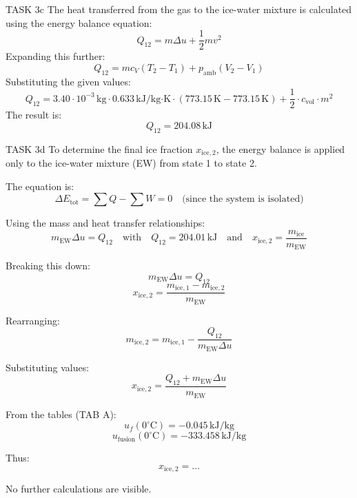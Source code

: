 TASK 3c  
The heat transferred from the gas to the ice-water mixture is calculated using the energy balance equation:  
\[
Q_{12} = m \Delta u + \frac{1}{2} m v^2
\]  
Expanding this further:  
\[
Q_{12} = m c_V (T_2 - T_1) + p_{\text{amb}} (V_2 - V_1)
\]  
Substituting the given values:  
\[
Q_{12} = 3.40 \cdot 10^{-3} \, \text{kg} \cdot 0.633 \, \text{kJ/kg·K} \cdot (773.15 \, \text{K} - 773.15 \, \text{K}) + \frac{1}{2} \cdot c_{\text{vol}} \cdot m^2
\]  
The result is:  
\[
Q_{12} = 204.08 \, \text{kJ}
\]  

TASK 3d  
To determine the final ice fraction \( x_{\text{ice},2} \), the energy balance is applied only to the ice-water mixture (EW) from state 1 to state 2.  

The equation is:  
\[
\Delta E_{\text{tot}} = \sum Q - \sum W = 0 \quad \text{(since the system is isolated)}
\]  

Using the mass and heat transfer relationships:  
\[
m_{\text{EW}} \Delta u = Q_{12} \quad \text{with} \quad Q_{12} = 204.01 \, \text{kJ} \quad \text{and} \quad x_{\text{ice},2} = \frac{m_{\text{ice}}}{m_{\text{EW}}}
\]  

Breaking this down:  
\[
m_{\text{EW}} \Delta u = Q_{12}
\]  
\[
x_{\text{ice},2} = \frac{m_{\text{ice},1} - m_{\text{ice},2}}{m_{\text{EW}}}
\]  

Rearranging:  
\[
m_{\text{ice},2} = m_{\text{ice},1} - \frac{Q_{12}}{m_{\text{EW}} \Delta u}
\]  

Substituting values:  
\[
x_{\text{ice},2} = \frac{Q_{12} + m_{\text{EW}} \Delta u}{m_{\text{EW}}}
\]  

From the tables (TAB A):  
\[
u_f(0^\circ\text{C}) = -0.045 \, \text{kJ/kg}
\]  
\[
u_{\text{fusion}}(0^\circ\text{C}) = -333.458 \, \text{kJ/kg}
\]  

Thus:  
\[
x_{\text{ice},2} = \ldots
\]  

No further calculations are visible.